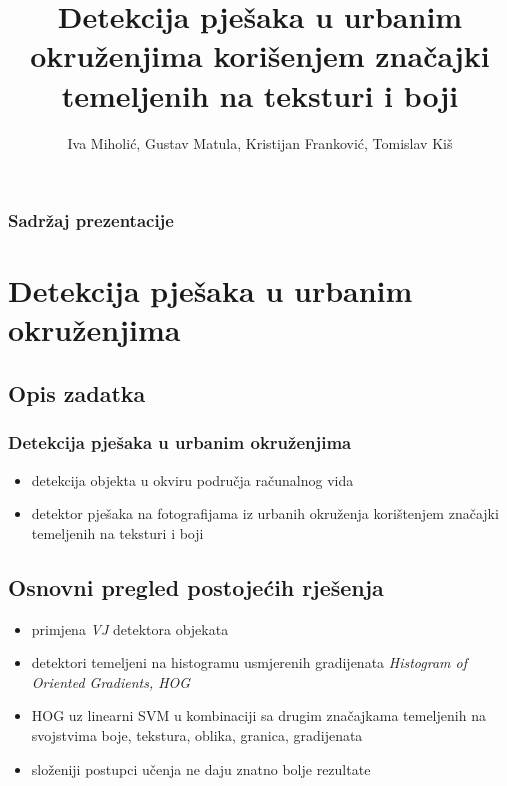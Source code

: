 \documentclass{beamer}
\title{Detekcija pješaka u urbanim okruženjima korišenjem značajki temeljenih na teksturi i boji}
\author{Iva Miholić, Gustav Matula, Kristijan Franković, Tomislav Kiš}
\begin{document}
\begin{frame}
\maketitle
\end{frame}

\begin{frame}
\frametitle{Sadržaj prezentacije}
\tableofcontents
\end{frame}

\section{Detekcija pješaka u urbanim okruženjima}
\subsection{Opis zadatka}
\begin{frame}
\frametitle{Detekcija pješaka u urbanim okruženjima}
\begin{itemize}
\item detekcija objekta u okviru područja računalnog vida
\item detektor pješaka na fotografijama iz urbanih okruženja korištenjem značajki temeljenih na teksturi i boji
\end{itemize}
\end{frame}

\subsection{Osnovni pregled postojećih rješenja}
\begin{frame}
\begin{itemize}
\frametitle{Osnovni pregled postojećih rješenja}
\item primjena \emph{VJ} detektora objekata \cite{VJ}
\item detektori temeljeni na histogramu usmjerenih gradijenata \emph{Histogram of Oriented Gradients, HOG} \cite{HOG}
\item HOG uz linearni SVM u kombinaciji sa drugim značajkama temeljenih na svojstvima boje, tekstura, oblika, granica, gradijenata
\item složeniji postupci učenja ne daju znatno bolje rezultate \cite{BenensonOHS14}
\end{itemize}
\end{frame}
\end{document}
